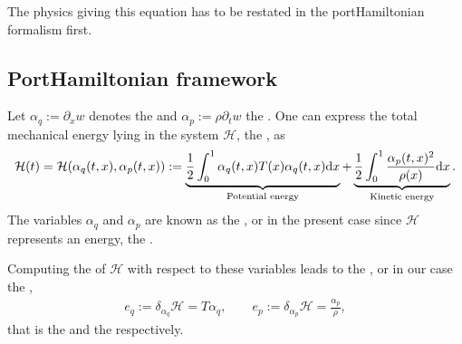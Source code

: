 \documentclass[letterpaper,10pt,english]{sphinxmanual}
\begin{document}
\sphinxAtStartPar
The physics giving this equation has to be restated in the
port\sphinxhyphen{}Hamiltonian formalism first.


\subsection{Port\sphinxhyphen{}Hamiltonian framework}
\label{\detokenize{started:port-hamiltonian-framework}}
\sphinxAtStartPar
Let \(\alpha_q := \partial_x w\) denotes the  and
\(\alpha_p := \rho \partial_t w\) the . One can
express the total mechanical energy lying in the system
\(\mathcal{H}\), the , as
\begin{equation*}
\begin{split}\mathcal{H}(t) = \mathcal{H}(\alpha_q(t,x), \alpha_p(t,x)) := \underbrace{\frac{1}{2} \int_0^1 \alpha_q(t,x) T(x) \alpha_q(t,x) {\rm d}x}_{\text{Potential energy}} + \underbrace{\frac{1}{2} \int_0^1 \frac{\alpha_p(t,x)^2}{\rho(x)} {\rm d}x}_{\text{Kinetic energy}}.\end{split}
\end{equation*}
\sphinxAtStartPar
The variables \(\alpha_q\) and \(\alpha_p\) are known as the
, or in the present case since \(\mathcal{H}\)
represents an energy, the .

\sphinxAtStartPar
Computing the 
of \(\mathcal{H}\) with respect to these variables leads to the
, or in our case the ,
\begin{equation*}
\begin{split}e_q := \delta_{\alpha_q} \mathcal{H} = T \alpha_q, \qquad e_p := \delta_{\alpha_p} \mathcal{H} = \frac{\alpha_p}{\rho},\end{split}
\end{equation*}
\sphinxAtStartPar
that is the  and the  respectively.
\end{document}
